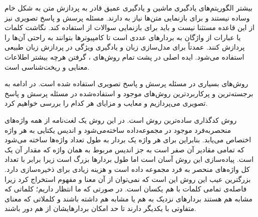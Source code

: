 		بیشتر الگوریتم‌های یادگیری ماشین و یادگیری عمیق  قادر به پردازش متن به شکل خام وساده نیستند  و برای بازنمایی متن‌ها نیاز به 
		دارند. مسئله پرسش و پاسخ تصویری نیز از این قاعده مستثنا نیست و باید برای بازنمایی سوالات از 
		استفاده کند.
	 نگاشت کلمات یا عبارات از واژگان به بردارهای عددی است تا کامپیوترها بتوانند به راحتی آن‌ها را پردازش کنند. 
	 عمدتاً برای مدل‌سازی زبان و یادگیری ویژگی در پردازش زبان طبیعی استفاده می‌شود. ایده اصلی در پشت تمام روش‌های
	 ، گرفتن هرچه بیشتر اطلاعات معنایی و ریخت‌شناسی است. 
	 
	 روش‌های 
	 بسیاری در مسئله پرسش و پاسخ تصویری استفاده شده است. در ادامه به برجسته‌ترین و پرکاربردترین روش‌های
	  موجود و استفاده‌شده در مسئله پرسش و پاسخ تصویری می‌پردازیم و معایب و مزایای هر کدام را بررسی خواهیم کرد.
	  
	  روش کدگذاری
	  ساده‌ترین روش
	  است. در این روش یک لغت‌‌نامه از همه واژه‌های منحصربه‌فرد موجود در مجموعه‌داده ساخته‌می‌شود و اندیس یکتایی به هر واژه اختصاص می‌یابد. بنابراین برای هر واژه یک بردار به طول تعداد واژ‌ه‌ها ساخته می‌شود که تمامی مقادیر آن صفر است به جز اندیس مربوط به همان واژه که مقدار آن یک است. پیاده‌سازی این روش آسان است اما طول بردارها  بزرگ است زیرا برابر با تعداد کل واژه‌های منحصر به فرد مجموعه داده است و هزینه زیادی برای ذخیره‌سازی دارد. بزرگترین عیب این روش  این است که نمی‌توان از آن معنا  و مفهوم استخراج کرد زیرا فاصله‌ی تمامی کلمات با هم یکسان است. در صورتی که ما انتظار داریم؛ کلماتی که مشابه هم هستند بردارهای نزدیک به هم یا مشابه هم داشته باشند و کلملاتی که معنای متفاوتی با یکدیگر دارند تا حد امکان بردارهایشان از هم دور باشند.  
		

